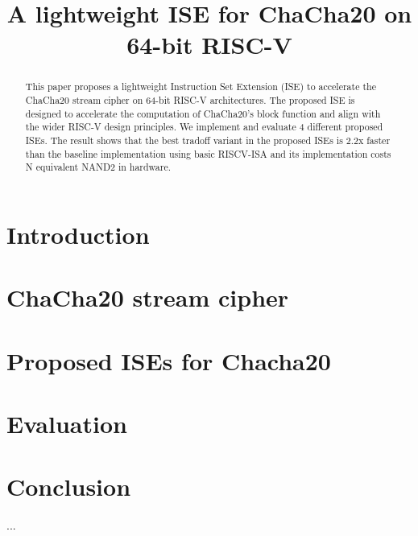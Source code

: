 \documentclass[submission]{iacrtrans}
\title{A lightweight ISE for ChaCha20 on 64-bit RISC-V}
\author{}
\begin{document}

\maketitle

\begin{abstract}
This paper proposes a lightweight Instruction Set Extension (ISE) to accelerate the ChaCha20 stream cipher on 64-bit RISC-V architectures. The proposed ISE is designed to accelerate the computation of ChaCha20's block function and align with the wider RISC-V design principles. We implement and evaluate 4 different proposed ISEs. The result shows that the best tradoff variant in the proposed ISEs is 2.2x faster than the baseline implementation using basic RISCV-ISA and its implementation costs N equivalent NAND2 in hardware.
\end{abstract}



\section{Introduction}
\label{sec:intro}


\section{ChaCha20 stream cipher}
\label{sec:bg}


\section{Proposed ISEs for Chacha20}
\label{sec:ise}


\section{Evaluation}
\label{sec:res}


\section{Conclusion}
\label{sec:outro}
...





\end{document}
